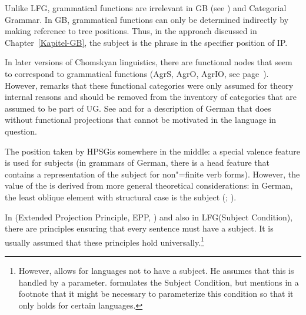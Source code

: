 Unlike LFG, grammatical functions are irrelevant in GB (see \citealp{Williams84a,Sternefeld85a}) and Categorial Grammar\indexcg. In GB, grammatical functions can only be
determined indirectly by making reference to tree positions. Thus, in the approach discussed in
Chapter~\ref{Kapitel-GB}, the subject is the phrase in the specifier position of IP.

In later versions of Chomskyan linguistics, there are functional nodes that seem to correspond to grammatical functions (AgrS,
AgrO, AgrIO, see
page~\pageref{Seite-AgrO}). However, \citet[Section~4.10.1]{Chomsky95a-u} remarks that these functional categories were only assumed for theory internal reasons
and should be removed from the inventory of categories that are assumed to be part of UG. See  and  for a description of German that does without functional projections
that cannot be motivated in the language in question.

The position taken by HPSG\indexhpsg is somewhere in the middle: a special valence feature is used for subjects (in grammars of German, there is a head feature that contains a
representation of the subject for non"=finite verb forms). However, the value of the \subjf is
derived from more general theoretical considerations: in German, the least oblique
element with structural case is the subject (\citealp[]{Mueller2002b};
\citealp[]{MuellerLehrbuch1}).

In \gbt (Extended Projection Principle, EPP, ) and also in LFG\indexlfg (Subject Condition), there are principles
ensuring that every sentence must have a subject. It is usually assumed that these principles hold universally.\footnote{ 
  However, \citet[]{Chomsky81a} allows for languages not to have a subject. He assumes that this is handled by a parameter.
 \citet[]{Bresnan2001a} formulates the Subject Condition, but mentions in a footnote that it might be necessary
to parameterize this condition so that it only holds for certain languages.%
} 
  
